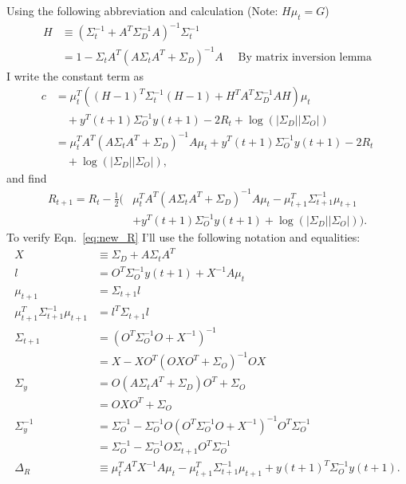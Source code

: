 \documentclass[12pt]{article}
\newcommand{\ti}[2]{{#1}{(#2)}}                         %
\newcommand{\logdet}{\log\left(\left|\Sigma_D\right| \left| \Sigma_O
    \right| \right)}
\begin{document}
Using the following abbreviation and calculation (Note: $H\mu_t = G$)
\begin{align*}
  H &\equiv (\Sigma_t^{-1} + A^T \Sigma_D^{-1}A)^{-1} \Sigma_t^{-1} \\
  &= 1 - \Sigma_t A^T(A\Sigma_t A^T + \Sigma_D)^{-1} A \quad \text{ By
    matrix inversion lemma}
\end{align*}
I write the constant term as
\begin{align*}
  c &= \mu_t^T \left( (H-1)^T\Sigma_t^{-1} (H-1) + H^TA^T\Sigma_D^{-1}
    AH \right) \mu_t \\
  & \quad + \ti{y^T}{t+1} \Sigma_O^{-1}
  \ti{y}{t+1} - 2R_t + \logdet\\
  &= \mu_t^T  A^T(A\Sigma_t A^T + \Sigma_D)^{-1}A \mu_t
  + \ti{y^T}{t+1} \Sigma_O^{-1} \ti{y}{t+1} - 2R_t \\
  & \quad + \logdet,
\end{align*}
and find
\begin{align*}
  R_{t+1} = R_t -\frac{1}{2} \Big( &
  \mu_t^T  A^T(A\Sigma_t A^T + \Sigma_D)^{-1}A \mu_t 
   - \mu_{t+1}^T \Sigma_{t+1}^{-1} \mu_{t+1} \\
  & + \ti{y^T}{t+1} \Sigma_O^{-1} \ti{y}{t+1} + \logdet \Big).
\end{align*}
To verify Eqn.~\eqref{eq:new_R} I'll use the following notation and
equalities:
\begin{align}
  X &\equiv \Sigma_D + A \Sigma_t A^T \\
  l &= O^T\Sigma_O^{-1} \ti{y}{t+1} + X^{-1} A \mu_t \\
  \mu_{t+1} &= \Sigma_{t+1} l \\
  \mu_{t+1}^T \Sigma_{t+1}^{-1} \mu_{t+1} &= l^T \Sigma_{t+1} l \\
  \Sigma_{t+1} &= (O^T\Sigma_O^{-1}O + X^{-1})^{-1} \\
  &= X - XO^T(OXO^T + \Sigma_O)^{-1} OX \\
  \Sigma_y &= O(A\Sigma_t A^T + \Sigma_D) O^T + \Sigma_O \\
  &= OXO^T + \Sigma_O \\
  \Sigma_y^{-1} &= \Sigma_O^{-1} - \Sigma_O^{-1} O (O^T\Sigma_O^{-1}O
  + X^{-1})^{-1}O^T \Sigma_O^{-1} \\
  &= \Sigma_O^{-1} - \Sigma_O^{-1} O \Sigma_{t+1}O^T \Sigma_O^{-1} \\
  \Delta_R &\equiv \mu_t^TA^T X^{-1} A \mu_t - \mu_{t+1}^T
  \Sigma_{t+1}^{-1} \mu_{t+1} + \ti{y}{t+1}^T \Sigma_O^{-1} \ti{y}{t+1}.
\end{align}
\end{document}
